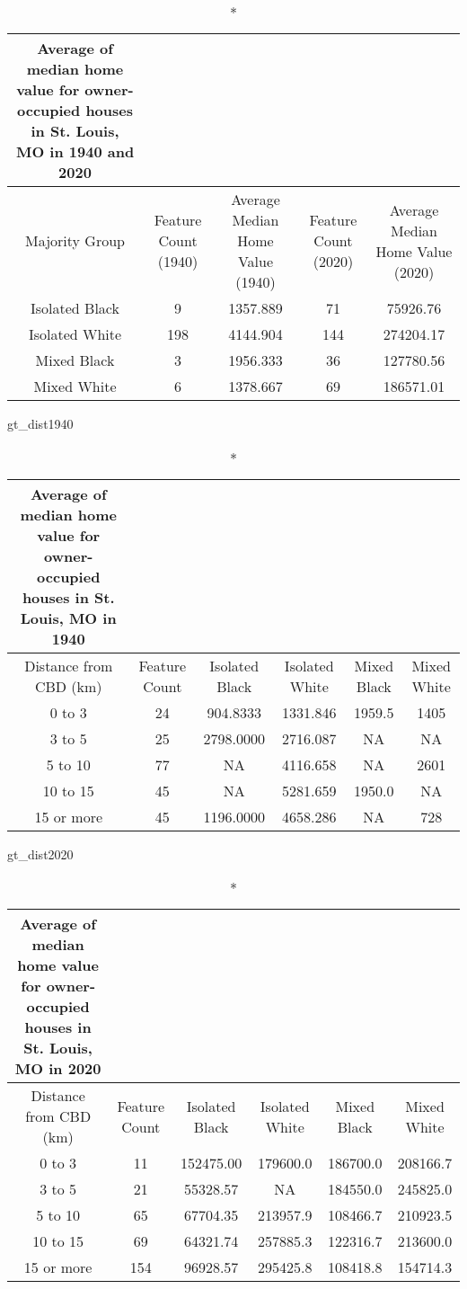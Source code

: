 \documentclass[
]{article}
\newenvironment{Shaded}{\begin{snugshade}}{\end{snugshade}}
\newcommand{\NormalTok}[1]{#1}
\begin{document}
\begin{longtable}{ccccc}
\caption*{
{\large Average of median home value for owner-occupied houses in St. Louis, MO in 1940 and 2020}
} \\ 
\toprule
Majority Group & Feature Count (1940) & Average Median Home Value (1940) & Feature Count (2020) & Average Median Home Value (2020) \\ 
\midrule
Isolated Black & 9 & 1357.889 & 71 & 75926.76 \\ 
Isolated White & 198 & 4144.904 & 144 & 274204.17 \\ 
Mixed Black & 3 & 1956.333 & 36 & 127780.56 \\ 
Mixed White & 6 & 1378.667 & 69 & 186571.01 \\ 
\bottomrule
\end{longtable}

\begin{Shaded}
\begin{Highlighting}[]
\NormalTok{gt\_dist1940}
\end{Highlighting}
\end{Shaded}

\begin{longtable}{cccccc}
\caption*{
{\large Average of median home value for owner-occupied houses in St. Louis, MO in 1940}
} \\ 
\toprule
Distance from CBD (km) & Feature Count & Isolated Black & Isolated White & Mixed Black & Mixed White \\ 
\midrule
0 to 3 & 24 & 904.8333 & 1331.846 & 1959.5 & 1405 \\ 
3 to 5 & 25 & 2798.0000 & 2716.087 & NA & NA \\ 
5 to 10 & 77 & NA & 4116.658 & NA & 2601 \\ 
10 to 15 & 45 & NA & 5281.659 & 1950.0 & NA \\ 
15 or more & 45 & 1196.0000 & 4658.286 & NA & 728 \\ 
\bottomrule
\end{longtable}

\begin{Shaded}
\begin{Highlighting}[]
\NormalTok{gt\_dist2020}
\end{Highlighting}
\end{Shaded}

\begin{longtable}{cccccc}
\caption*{
{\large Average of median home value for owner-occupied houses in St. Louis, MO in 2020}
} \\ 
\toprule
Distance from CBD (km) & Feature Count & Isolated Black & Isolated White & Mixed Black & Mixed White \\ 
\midrule
0 to 3 & 11 & 152475.00 & 179600.0 & 186700.0 & 208166.7 \\ 
3 to 5 & 21 & 55328.57 & NA & 184550.0 & 245825.0 \\ 
5 to 10 & 65 & 67704.35 & 213957.9 & 108466.7 & 210923.5 \\ 
10 to 15 & 69 & 64321.74 & 257885.3 & 122316.7 & 213600.0 \\ 
15 or more & 154 & 96928.57 & 295425.8 & 108418.8 & 154714.3 \\ 
\bottomrule
\end{longtable}
\end{document}
